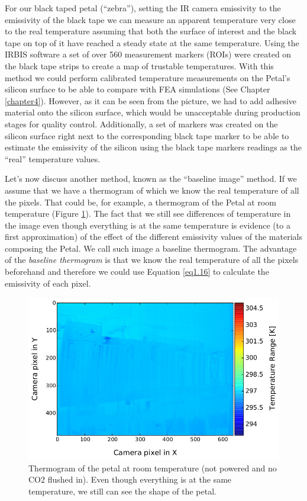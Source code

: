 		For our black taped petal (“zebra”), setting the IR camera emissivity to the emissivity of the black tape we can measure an apparent temperature very close to the real temperature assuming that both the surface of interest and the black tape on top of it have reached a steady state at the same temperature. Using the IRBIS software a set of over 560 measurement markers (ROIs) were created on the black tape strips to create a map of trustable temperatures. With this method we could perform calibrated temperature measurements on the Petal’s silicon surface to be able to compare with FEA simulations (See Chapter \ref{chapter4}). However, as it can be seen from the picture, we had to add adhesive material onto the silicon surface, which would be unacceptable during production stages for quality control. Additionally, a set of markers was created on the silicon surface right next to the corresponding black tape marker to be able to estimate the emissivity of the silicon using the black tape markers readings as the “real” temperature values. 
		
		Let’s now discuss another method, known as the “baseline image” method. If we assume that we have a thermogram of which we know the real temperature of all the pixels. That could be, for example, a thermogram of the Petal at room temperature (Figure \ref{fig3.3}). The fact that we still see differences of temperature in the image even though everything is at the same temperature is evidence (to a first approximation) of the effect of the different emissivity values of the materials composing the Petal. We call such image a baseline thermogram. The advantage of the \textit{baseline thermogram} is that we know the real temperature of all the pixels beforehand and therefore we could use Equation \ref{eq1.16} to calculate the emissivity of each pixel. 
	
		\begin{figure}[ht!]
			\centering
			\captionsetup{justification=centering,margin=2cm}
			\includegraphics[scale=0.55]{Figures/Chapter03/thermo_Temp_201708091701_avg.jpg}
			\caption{Thermogram of the petal at room temperature (not powered and no CO2 flushed in). Even though everything is at the same temperature, we still can see the shape of the petal.}\label{fig3.3}
		\end{figure}
	
